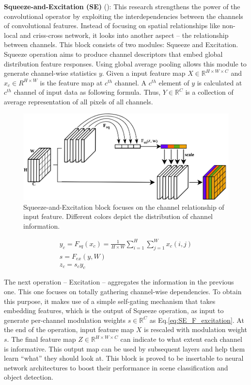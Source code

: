 \textbf{Squeeze-and-Excitation (SE)} (\textcolor{cyan}{\cite{hu2018squeeze}}):
This research strengthens the power of the convolutional operator by exploiting the interdependencies between the channels of convolutional features. Instead of focusing on spatial relationships like non-local and criss-cross network, it looks into another aspect – the relationship between channels. This block consists of two modules: Squeeze and Excitation. Squeeze operation aims to produce channel descriptors that embed global distribution feature responses. Using global average pooling allows this module to generate channel-wise statistics $y$. Given a input feature map $X \in \mathbb{R}^{H \times W \times C}$ and $x_c \in R^{H \times W}$ is the feature map at $c^{th}$ channel. A $c^{th}$ element of $y$ is calculated at $c^{th}$ channel of input data as following formula. Thus, $Y \in \mathbb{R}^C$ is a collection of average representation of all pixels of all channels.
\begin{figure}[h!]
 	\centering	
 	\includegraphics[width= 0.8\linewidth]{figs/SE.png}
 	\caption{Squeeze-and-Excitation block focuses on the channel relationship of input feature. Different colors depict the distribution of channel information.}
 	\label{fig:SE}
\end{figure}
\begin{gather}
\label{eq:SE_F_squeeze}
y_c = F_{sq}(x_c)= \frac{1}{H \times W}\sum_{i=1}^{H} \sum_{j=1}^{W}x_c(i,j)\\
\label{eq:SE_F_excitation}
s=F_{ex}(y, W)\\
z_c = s_c y_c \
\end{gather}

The next operation – Excitation – aggregates the information in the previous one. This one focuses on totally gathering channel-wise dependencies. To obtain this purpose, it makes use of a simple self-gating mechanism that takes embedding features, which is the output of Squeeze operation, as input to generate per-channel modulation weights $s \in \mathbb{R}^C$ as Eq.\ref{eq:SE_F_excitation}. At the end of the operation, input feature map $X$ is rescaled with modulation weight $s$. The final feature map $Z \in \mathbb{R}^{H \times W \times C}$ can indicate to what extent each channel is informative. This output map can be used by subsequent layers and help them learn “what” they should look at. This block is proved to be insertable to neural network architectures to boost their performance in scene classification and object detection.

